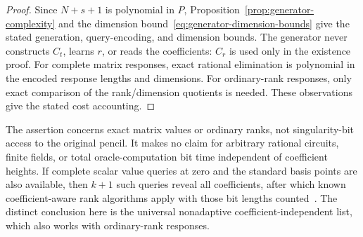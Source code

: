 \begin{proof}
Since $N+s+1$ is polynomial in $P$, Proposition~\ref{prop:generator-complexity}
and the dimension bound~\eqref{eq:generator-dimension-bounds} give
the stated generation, query-encoding, and dimension bounds. The
generator never constructs $C_t$, learns $r$, or reads the
coefficients: $C_r$ is used only in the existence proof. For complete
matrix responses, exact rational elimination is polynomial in the
encoded response lengths and dimensions. For ordinary-rank responses,
only exact comparison of the rank/dimension quotients is needed.
These observations give the stated cost accounting.
\end{proof}

The assertion concerns exact matrix values or ordinary ranks, not
singularity-bit access to the original pencil. It makes no claim for
arbitrary rational circuits, finite fields, or total oracle-computation
bit time independent of coefficient heights. If complete scalar value
queries at zero and the standard basis points are also available, then
$k+1$ such queries reveal all coefficients, after which known
coefficient-aware rank algorithms apply with those bit lengths
counted~\citep[arXiv version, Theorem~1.5]{IQS18}. The distinct
conclusion here is the universal nonadaptive coefficient-independent
list, which also works with ordinary-rank responses.

